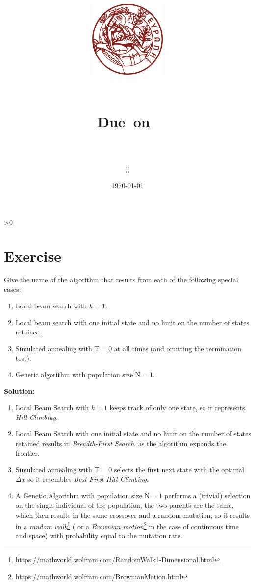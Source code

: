 \documentclass{article}
\title{
	\centering
	\includegraphics[height=1.5in]{images/background.png}
	
	 \vspace{1in}
	\textmd{\textbf{\hmwkClass\ \hmwkTitle}}\\
	
	\normalsize\vspace{0.1in}\small{Due\ on\ \hmwkDueDate}\\
	
	\vspace{0.1in}
	\large{\textit{\hmwkClassInstructor}} \\
	\vspace{0.5in}
	
	\large{\hmwkUniversity}

	\vspace{3in}
	
	\author{\textbf{\hmwkAuthorName} (\hmwkAuthorID)}
	\date{\today}
}
\newcounter{partCounter}
\newcounter{ExerciseCounter}
\newenvironment{Exercise}[1][-1]{
	\ifnum#1>0
	\setcounter{ExerciseCounter}{#1}
	\fi
	\section{Exercise \arabic{ExerciseCounter}}
	\setcounter{partCounter}{1}
}{
}
\newcommand{\solution}{\textbf{\large Solution:}}
\begin{document}
	\maketitle
	
	
	\begin{Exercise}[1]
		Give the name of the algorithm that results from each of the following special cases:
		\begin{enumerate}
			\item Local beam search with $k=1$.
			\item Local beam search with one initial state and no limit on the number of states retained.
			\item Simulated annealing with $\mathrm{T}=0$ at all times (and omitting the termination test).
			\item Genetic algorithm with population size $\mathrm{N}=1$.
		\end{enumerate} \vspace{6pt}
	
		\solution \\
		
		\begin{enumerate}
			\item Local Beam Search with $k=1$ keeps track of only one state, so it represents \textit{Hill-Climbing}. 
			\item Local Beam Search with one initial state and no limit on the number of states retained results in \textit{Breadth-First Search}, as the algorithm expands the frontier.
            \item Simulated annealing with $\mathrm{T} = 0$ selects the first next state with the optimal $\Delta x$ so it resembles \textit{Best-First Hill-Climbing}. %
            \item A Genetic Algorithm with population size $\mathrm{N} = 1$ performs a (trivial) selection on the single individual of the population, the two parents are the same, which then results in the same crossover and a random mutation, so it results in a \textit{random walk}\footnote{\url{https://mathworld.wolfram.com/RandomWalk1-Dimensional.html}} ( or a \textit{Brownian motion}\footnote{\url{https://mathworld.wolfram.com/BrownianMotion.html}} in the case of continuous time and space) with probability equal to the mutation rate.
		\end{enumerate}
		
	\end{Exercise}
\end{document}
